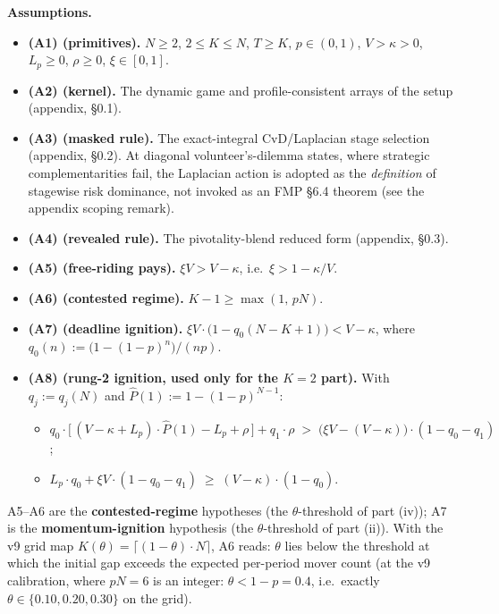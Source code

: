 \medskip
\noindent\textbf{Assumptions.}
\begin{itemize}
\item \textbf{(A1) (primitives).} $N \ge 2$, $2 \le K \le N$, $T \ge K$, $p \in (0,1)$, $V > \kappa > 0$, $L_p \ge 0$, $\rho \ge 0$, $\xi \in [0,1]$.
\item \textbf{(A2) (kernel).} The dynamic game and profile-consistent arrays of the setup (appendix, \S 0.1).
\item \textbf{(A3) (masked rule).} The exact-integral CvD/Laplacian stage selection (appendix, \S 0.2). At diagonal volunteer's-dilemma states,
  where strategic complementarities fail, the Laplacian action is adopted as the
  \emph{definition} of stagewise risk dominance, not invoked as an FMP \S6.4 theorem
  (see the appendix scoping remark).
\item \textbf{(A4) (revealed rule).} The pivotality-blend reduced form (appendix, \S 0.3).
\item \textbf{(A5) (free-riding pays).} $\xi V > V - \kappa$, i.e.\ $\xi > 1 - \kappa/V$.
\item \textbf{(A6) (contested regime).} $K - 1 \ge \max(1,\, pN)$.
\item \textbf{(A7) (deadline ignition).} $\xi V \cdot \bigl(1 - q_0(N-K+1)\bigr) < V - \kappa$, where $q_0(n) := \bigl(1 - (1-p)^n\bigr)/(np)$.
\item \textbf{(A8) (rung-2 ignition, used only for the $K = 2$ part).} With $q_j := q_j(N)$ and $\widehat P(1) := 1 - (1-p)^{N-1}$:
  \begin{itemize}
  \item[\textbf{(C2)}] $q_0 \cdot \bigl[\, (V-\kappa+L_p)\cdot \widehat P(1) - L_p + \rho \,\bigr] + q_1 \cdot \rho \;>\; \bigl(\xi V - (V-\kappa)\bigr)\cdot(1 - q_0 - q_1)$;
  \item[\textbf{(C3)}] $L_p \cdot q_0 + \xi V \cdot (1 - q_0 - q_1) \;\ge\; (V-\kappa)\cdot(1 - q_0)$.
  \end{itemize}
\end{itemize}
A5--A6 are the \textbf{contested-regime} hypotheses (the $\theta$-threshold of part (iv)); A7 is the \textbf{momentum-ignition} hypothesis (the $\theta$-threshold of part (ii)). With the v9 grid map $K(\theta) = \lceil (1-\theta)\cdot N \rceil$, A6 reads: $\theta$ lies below the threshold at which the initial gap exceeds the expected per-period mover count (at the v9 calibration, where $pN = 6$ is an integer: $\theta < 1 - p = 0.4$, i.e.\ exactly $\theta \in \{0.10, 0.20, 0.30\}$ on the grid).

